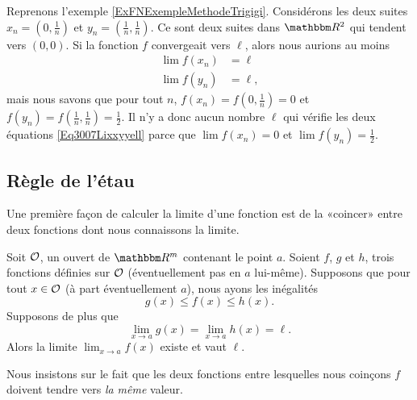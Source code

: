 \begin{example} \label{EXooNBTYooFyKRTB}
    Reprenons l'exemple \ref{ExFNExempleMethodeTrigigi}. Considérons les deux suites $x_n=(0,\frac{1}{ n })$ et $y_n=(\frac{1}{ n },\frac{1}{ n })$. Ce sont deux suites dans $\eR^2$ qui tendent vers $(0,0)$. Si la fonction $f$ convergeait vers $\ell$, alors nous aurions au moins
    \begin{subequations}\label{Eq3007Lixxyyell}
        \begin{align}
            \lim f(x_n)&=\ell\\
            \lim f(y_n)&=\ell,
        \end{align}
    \end{subequations}
    mais nous savons que pour tout $n$, $f(x_n)=f(0,\frac{1}{ n })=0$ et $f(y_n)=f(\frac{1}{ n },\frac{1}{ n })=\frac{1}{ 2 }$. Il n'y a donc aucun nombre $\ell$ qui vérifie les deux équations \eqref{Eq3007Lixxyyell} parce que $\lim f(x_n)=0$ et $\lim f(y_n)=\frac{ 1 }{2}$.
\end{example}

\subsection{Règle de l'étau}

Une première façon de calculer la limite d'une fonction est de la «coincer» entre deux fonctions dont nous connaissons la limite. 
\begin{theorem}		\label{ThoRegleEtau}
	Soit $\mathcal{O}$, un ouvert de $\eR^m$ contenant le point $a$. Soient $f$, $g$ et $h$, trois fonctions définies sur $\mathcal{O}$ (éventuellement pas en $a$ lui-même). Supposons que pour tout $x\in\mathcal{O}$ (à part éventuellement $a$), nous ayons les inégalités
	\begin{equation}
		g(x)\leq f(x)\leq h(x).
	\end{equation}
	Supposons de plus que
	\begin{equation}
		\lim_{x\to a} g(x)=\lim_{x\to a} h(x)=\ell.
	\end{equation}
	Alors la limite $\lim_{x\to a} f(x)$ existe et vaut $\ell$.
\end{theorem}

Nous insistons sur le fait que les deux fonctions entre lesquelles nous coinçons $f$ doivent tendre vers \emph{la même} valeur.

